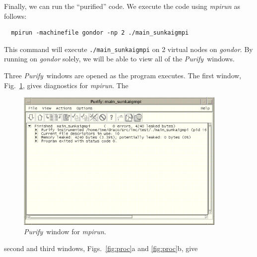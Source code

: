 \documentclass[note]{newmemo}
\newcommand{\purify}{\textsl{Purify}}
\newcommand{\dir}[1]{\textsl{#1}}
\begin{document}
Finally, we can run the ``purified'' code.  We execute the code using
\dir{mpirun} as follows:
\begin{verbatim}
  mpirun -machinefile gondor -np 2 ./main_sunkaigmpi
\end{verbatim}
This command will execute {\tt ./main\_sunkaigmpi} on 2 virtual nodes on
\dir{gondor}.  By running on \dir{gondor} solely, we will be able to
view all of the \purify\ windows.

Three \purify\ windows are opened as the program executes.  The first
window, Fig.~\ref{fig:main}, gives diagnostics for \dir{mpirun}.  The
\begin{figure}
  \centerline{\includegraphics[width=4in]{main}}
  \caption{\purify\ window for \dir{mpirun}.}
  \label{fig:main}
\end{figure}
second and third windows, Figs.~\ref{fig:proc}a and \ref{fig:proc}b, give
\end{document}

